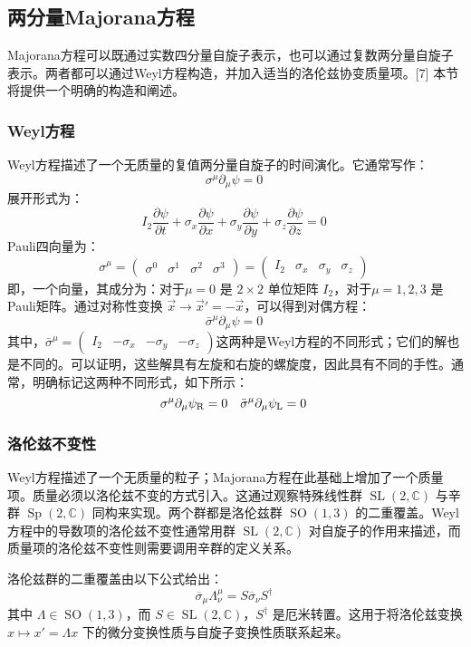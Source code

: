 \subsection{两分量Majorana方程}
Majorana方程可以既通过实数四分量自旋子表示，也可以通过复数两分量自旋子表示。两者都可以通过Weyl方程构造，并加入适当的洛伦兹协变质量项。[7] 本节将提供一个明确的构造和阐述。
\subsubsection{Weyl方程}
Weyl方程描述了一个无质量的复值两分量自旋子的时间演化。它通常写作：
\[
\sigma^{\mu} \partial_{\mu} \psi = 0~
\]
展开形式为：
\[
I_2 \frac{\partial \psi}{\partial t} + \sigma_x \frac{\partial \psi}{\partial x} + \sigma_y \frac{\partial \psi}{\partial y} + \sigma_z \frac{\partial \psi}{\partial z} = 0~
\]
Pauli四向量为：
\[
\sigma^{\mu} = \begin{pmatrix} \sigma^0 & \sigma^1 & \sigma^2 & \sigma^3 \end{pmatrix} = \begin{pmatrix} I_2 & \sigma_x & \sigma_y & \sigma_z \end{pmatrix}~
\]
即，一个向量，其成分为：对于\(\mu = 0\) 是 \(2 \times 2\) 单位矩阵 \(I_2\)，对于\(\mu = 1, 2, 3\) 是Pauli矩阵。通过对称性变换 \( \vec{x} \to \vec{x}' = -\vec{x} \)，可以得到对偶方程：
\[
\bar{\sigma}^{\mu} \partial_{\mu} \psi = 0~
\]
其中，\(\bar{\sigma}^{\mu} = \begin{pmatrix} I_2 & -\sigma_x &-\sigma_y & -\sigma_z \end{pmatrix}\)这两种是Weyl方程的不同形式；它们的解也是不同的。可以证明，这些解具有左旋和右旋的螺旋度，因此具有不同的手性。通常，明确标记这两种不同形式，如下所示：
\[
\sigma^{\mu} \partial_{\mu} \psi_{\rm {R}} = 0 \quad \bar{\sigma}^{\mu} \partial_{\mu} \psi_{\rm {L}} = 0~
\]
\subsubsection{洛伦兹不变性}
Weyl方程描述了一个无质量的粒子；Majorana方程在此基础上增加了一个质量项。质量必须以洛伦兹不变的方式引入。这通过观察特殊线性群 \( \operatorname{SL}(2, \mathbb{C}) \) 与辛群 \( \operatorname{Sp}(2, \mathbb{C}) \) 同构来实现。两个群都是洛伦兹群 \( \operatorname{SO}(1,3) \) 的二重覆盖。Weyl方程中的导数项的洛伦兹不变性通常用群 \( \operatorname{SL}(2, \mathbb{C}) \) 对自旋子的作用来描述，而质量项的洛伦兹不变性则需要调用辛群的定义关系。

洛伦兹群的二重覆盖由以下公式给出：
\[
\overline{\sigma}_{\mu} \Lambda^{\mu}_{\nu} = S \overline{\sigma}_{\nu} S^{\dagger}~
\]
其中 \( \Lambda \in \operatorname{SO}(1, 3) \)，而 \( S \in \operatorname{SL}(2, \mathbb{C}) \)，\( S^{\dagger} \) 是厄米转置。这用于将洛伦兹变换 \( x \mapsto x' = \Lambda x \) 下的微分变换性质与自旋子变换性质联系起来。

